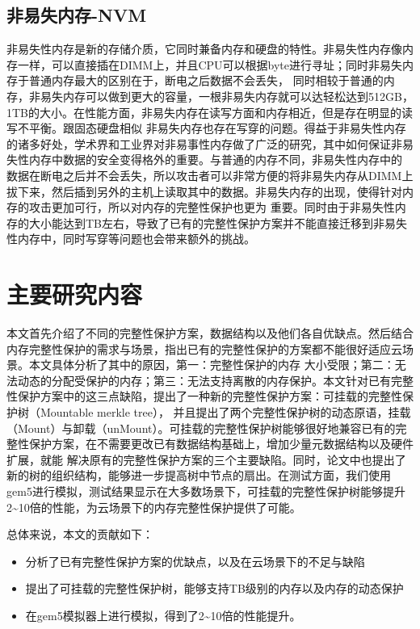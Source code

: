 \subsection{非易失内存-NVM}
非易失性内存是新的存储介质，它同时兼备内存和硬盘的特性。非易失性内存像内存一样，可以直接插在DIMM上，并且CPU可以根据byte进行寻址；同时非易失内存于普通内存最大的区别在于，断电之后数据不会丢失，
同时相较于普通的内存，非易失内存可以做到更大的容量，一根非易失内存就可以达轻松达到512GB，1TB的大小。在性能方面，非易失内存在读写方面和内存相近，但是存在明显的读写不平衡。跟固态硬盘相似
非易失内存也存在写穿的问题。得益于非易失性内存的诸多好处，学术界和工业界对非易事性内存做了广泛的研究，其中如何保证非易失性内存中数据的安全变得格外的重要。与普通的内存不同，非易失性内存中的
数据在断电之后并不会丢失，所以攻击者可以非常方便的将非易失内存从DIMM上拔下来，然后插到另外的主机上读取其中的数据。非易失内存的出现，使得针对内存的攻击更加可行，所以对内存的完整性保护也更为
重要。同时由于非易失性内存的大小能达到TB左右，导致了已有的完整性保护方案并不能直接迁移到非易失性内存中，同时写穿等问题也会带来额外的挑战。

\section{主要研究内容}
本文首先介绍了不同的完整性保护方案，数据结构以及他们各自优缺点。然后结合内存完整性保护的需求与场景，指出已有的完整性保护的方案都不能很好适应云场景。本文具体分析了其中的原因，第一：完整性保护的内存
大小受限；第二：无法动态的分配受保护的内存；第三：无法支持离散的内存保护。本文针对已有完整性保护方案中的这三点缺陷，提出了一种新的完整性保护方案：可挂载的完整性保护树（Mountable merkle tree），
并且提出了两个完整性保护树的动态原语，挂载（Mount）与卸载（unMount）。可挂载的完整性保护树能够很好地兼容已有的完整性保护方案，在不需要更改已有数据结构基础上，增加少量元数据结构以及硬件扩展，就能
解决原有的完整性保护方案的三个主要缺陷。同时，论文中也提出了新的树的组织结构，能够进一步提高树中节点的扇出。在测试方面，我们使用gem5进行模拟，测试结果显示在大多数场景下，可挂载的完整性保护树能够提升
2\sim10倍的性能，为云场景下的内存完整性保护提供了可能。

总体来说，本文的贡献如下：
\begin{itemize}
    \item 分析了已有完整性保护方案的优缺点，以及在云场景下的不足与缺陷
    \item 提出了可挂载的完整性保护树，能够支持TB级别的内存以及内存的动态保护
    \item 在gem5模拟器上进行模拟，得到了2\sim10倍的性能提升。
\end{itemize}

